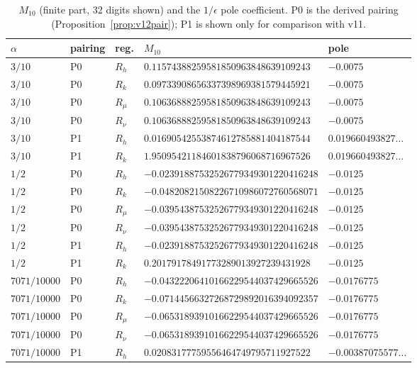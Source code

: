 \documentclass[11pt,a4paper]{article}
\theoremstyle{plain}
\theoremstyle{definition}
\theoremstyle{remark}
\numberwithin{equation}{section}
\begin{document}
\begin{center}
\small
\begin{longtable}{@{}lllll@{}}
\caption{\(M_{10}\) (finite part, 32 digits shown) and the \(1/\epsilon\) pole coefficient. P0 is the derived pairing (Proposition~\ref{prop:v12pair}); P1 is shown only for comparison with v11.}\label{tab:v12M10}\\
\toprule
\(\alpha\) & pairing & reg. & \(M_{10}\) & pole\\
\midrule
\(3/10\) & P0 & \(R_h\) & \(0.11574388259581850963848639109243\) & \(-0.0075\)\\
\(3/10\) & P0 & \(R_k\) & \(0.09733908656337398969381579445921\) & \(-0.0075\)\\
\(3/10\) & P0 & \(R_\mu\) & \(0.10636888259581850963848639109243\) & \(-0.0075\)\\
\(3/10\) & P0 & \(R_\nu\) & \(0.10636888259581850963848639109243\) & \(-0.0075\)\\
\(3/10\) & P1 & \(R_h\) & \(0.01690542553874612785881404187544\) & \(0.019660493827\ldots\)\\
\(3/10\) & P1 & \(R_k\) & \(1.95095421184601838796068716967526\) & \(0.019660493827\ldots\)\\
\(1/2\) & P0 & \(R_h\) & \(-0.02391887532526779349301220416248\) & \(-0.0125\)\\
\(1/2\) & P0 & \(R_k\) & \(-0.04820821508226710986072760568071\) & \(-0.0125\)\\
\(1/2\) & P0 & \(R_\mu\) & \(-0.03954387532526779349301220416248\) & \(-0.0125\)\\
\(1/2\) & P0 & \(R_\nu\) & \(-0.03954387532526779349301220416248\) & \(-0.0125\)\\
\(1/2\) & P1 & \(R_h\) & \(-0.02391887532526779349301220416248\) & \(-0.0125\)\\
\(1/2\) & P1 & \(R_k\) & \(0.20179178491773289013927239431928\) & \(-0.0125\)\\
\(7071/10000\) & P0 & \(R_h\) & \(-0.04322206410166229544037429665526\) & \(-0.0176775\)\\
\(7071/10000\) & P0 & \(R_k\) & \(-0.07144566327268729892016394092357\) & \(-0.0176775\)\\
\(7071/10000\) & P0 & \(R_\mu\) & \(-0.06531893910166229544037429665526\) & \(-0.0176775\)\\
\(7071/10000\) & P0 & \(R_\nu\) & \(-0.06531893910166229544037429665526\) & \(-0.0176775\)\\
\(7071/10000\) & P1 & \(R_h\) & \(0.02083177759556464749795711927522\) & \(-0.00387075577\ldots\)\\

\end{longtable}
\end{center}
\end{document}
